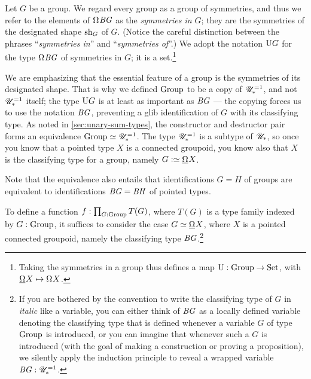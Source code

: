\begin{definition}\label{def:group-symmetries}
  Let $G$ be a group.
  We regard every group as a group of symmetries,
  and thus we refer to the elements of $\loops \BG$ as the
  \emph{symmetries in $G$};
  they are the symmetries of the designated shape $\mathrm{sh}_G$ of $G$.
  (Notice the careful distinction between the phrases
  ``\emph{symmetries in}'' and ``\emph{symmetries of}''.)
  We adopt the notation $\mathrm{U} G$ for the type $\loops \BG$ of symmetries in $G$;
  it is a set.\footnote{%
    Taking the symmetries in a group
    thus defines a map
    $\mathrm{U} : \mathrm{Group} \to \mathrm{Set}$,
    with $\mkgroup X \mapsto \loops X$.}
\end{definition}

\begin{remark}\label{rem:aut}
  We are emphasizing that the essential feature of a group
  is the symmetries of its designated shape.
  That is why we defined $\mathrm{Group}$ to be a copy of ${\mathscr{U}}_\ast^{=1}$,
  and not ${\mathscr{U}}_\ast^{=1}$ itself;
  the type $\mathrm{U} G$ is at least as important as $\mathit{B}\mathit{G}$
  --- the copying forces us to use the notation $\mathit{B}\mathit{G}$,
  preventing a glib identification of $G$ with its classifying type.
  As noted in \cref{sec:unary-sum-types},
  the constructor and destructor pair forms an equivalence $\mathrm{Group} \simeq {\mathscr{U}}_\ast^{=1}$.
  The type ${\mathscr{U}}_\ast^{=1}$ is a subtype of ${\mathscr{U}_*}$, so
  once you know that a pointed type $X$ is a connected groupoid,
  you know also that $X$ is the classifying type for a group,
  namely $G\defeq\mkgroup X$.

  Note that the equivalence also entails
  that identifications $G=H$ of groups are equivalent
  to identifications $\mathit{B}\mathit{G} = \mathit{B}\mathit{H}$ of pointed types.
\end{remark}

\begin{remark}\label{rem:BG-convention}
  To define a function $f : \prod_{G:\mathrm{Group}}T(G)$,
  where $T(G)$ is a type family indexed by $G:\mathrm{Group}$,
  it suffices to consider the case $G\jdeq\mkgroup X$,
  where $X$ is a pointed connected groupoid,
  namely the classifying type $\mathit{B}\mathit{G}$.\footnote{%
    If you are bothered by the convention
    to write the classifying type of $G$ in \emph{italic} like a variable,
    you can either think of $\mathit{B}\mathit{G}$ as a locally defined
    variable denoting the classifying type that is
    defined whenever a variable $G$ of type $\mathrm{Group}$ is introduced,
    or you can imagine that whenever such a $G$ is introduced
    (with the goal of making a construction or proving a proposition),
    we silently apply the induction principle to
    reveal a wrapped variable $\mathit{B}\mathit{G}:{\mathscr{U}}_\ast^{=1}$.}
\end{remark}

